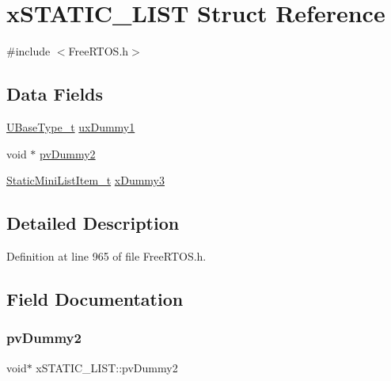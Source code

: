 \hypertarget{structx_s_t_a_t_i_c___l_i_s_t}{}\section{x\+S\+T\+A\+T\+I\+C\+\_\+\+L\+I\+ST Struct Reference}
\label{structx_s_t_a_t_i_c___l_i_s_t}


{\ttfamily \#include $<$Free\+R\+T\+O\+S.\+h$>$}

\subsection*{Data Fields}
\begin{DoxyCompactItemize}
\item 
\hyperlink{portmacro_8h_a646f89d4298e4f5afd522202b11cb2e6}{U\+Base\+Type\+\_\+t} \hyperlink{structx_s_t_a_t_i_c___l_i_s_t_a6d7f720dc21e3a676b885b72a945fea7}{ux\+Dummy1}
\item 
void $\ast$ \hyperlink{structx_s_t_a_t_i_c___l_i_s_t_a681e588716be5f49fe8e9eb73e8f280e}{pv\+Dummy2}
\item 
\hyperlink{_free_r_t_o_s_8h_a9097f48f4dfa56e8e01d9179462c7994}{Static\+Mini\+List\+Item\+\_\+t} \hyperlink{structx_s_t_a_t_i_c___l_i_s_t_a232545ebb5629617e0ee6ba286e37788}{x\+Dummy3}
\end{DoxyCompactItemize}


\subsection{Detailed Description}


Definition at line 965 of file Free\+R\+T\+O\+S.\+h.



\subsection{Field Documentation}
\mbox{\label{structx_s_t_a_t_i_c___l_i_s_t_a681e588716be5f49fe8e9eb73e8f280e}} 
\subsubsection{\texorpdfstring{pv\+Dummy2}{pvDummy2}}
{\footnotesize\ttfamily void$\ast$ x\+S\+T\+A\+T\+I\+C\+\_\+\+L\+I\+S\+T\+::pv\+Dummy2}



